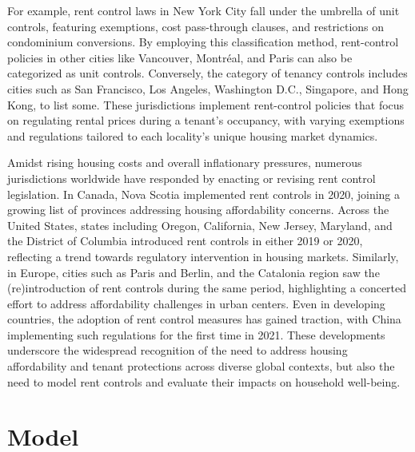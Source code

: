 \documentclass[parskip=full]{article}
\begin{document}
For example, rent control laws in New York City fall under the umbrella of unit controls, featuring exemptions, cost pass-through clauses, and restrictions on condominium conversions. By employing this classification method, rent-control policies in other cities like Vancouver, Montréal, and Paris can also be categorized as unit controls. Conversely, the category of tenancy controls includes cities such as San Francisco, Los Angeles, Washington D.C., Singapore, and Hong Kong, to list some. These jurisdictions implement rent-control policies that focus on regulating rental prices during a tenant's occupancy, with varying exemptions and regulations tailored to each locality's unique housing market dynamics.

Amidst rising housing costs and overall inflationary pressures, numerous jurisdictions worldwide have responded by enacting or revising rent control legislation. In Canada, Nova Scotia implemented rent controls in 2020, joining a growing list of provinces addressing housing affordability concerns. Across the United States, states including Oregon, California, New Jersey, Maryland, and the District of Columbia introduced rent controls in either 2019 or 2020, reflecting a trend towards regulatory intervention in housing markets. Similarly, in Europe, cities such as Paris and Berlin, and the Catalonia region saw the (re)introduction of rent controls during the same period, highlighting a concerted effort to address affordability challenges in urban centers. Even in developing countries, the adoption of rent control measures has gained traction, with China implementing such regulations for the first time in 2021. These developments underscore the widespread recognition of the need to address housing affordability and tenant protections across diverse global contexts, but also the need to model rent controls and evaluate their impacts on household well-being.

\section{Model}\label{sec:model}
\end{document}
